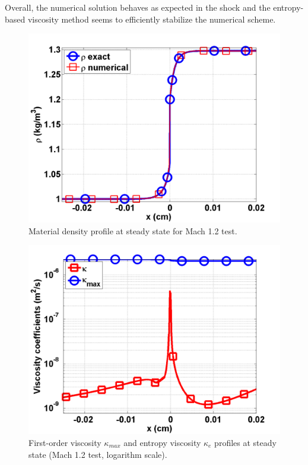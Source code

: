 \documentclass[review]{elsarticle}
\begin{document}
Overall, the numerical solution behaves as expected in the shock and the entropy-based viscosity method seems to efficiently stabilize the numerical scheme.  
\begin{figure}[H]
                \centering
                \includegraphics[width=\textwidth]{figs/Mach_1p2_nel_1000_density.png}
        \caption{Material density profile at steady state for Mach 1.2 test.}\label{fig:Mach12_density}
\end{figure}
\begin{figure}[H]
                \centering
                \includegraphics[width=\textwidth]{figs/Mach_1p2_nel_1000_viscosity.png}
        \caption{First-order viscosity $\kappa_{max}$ and entropy viscosity $\kappa_e$ profiles at steady state (Mach 1.2 test, logarithm scale).}\label{fig:Mach12_viscosity}
\end{figure}
\end{document}
